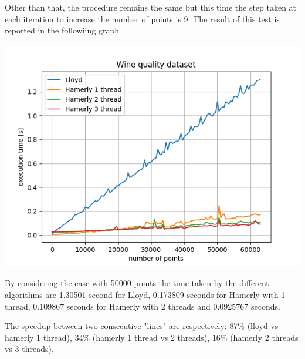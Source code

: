 \documentclass{report}
\begin{document}
\begin{minipage}[b]{0.48\textwidth}
  Other than that, the procedure remains the same but this time the step taken at each iteration to increase the number of points is 9. The result of this test is reported in the followiing graph

  \begin{center} 
    \includegraphics[width = 1\textwidth]{imgs/lh123_wine.png}
    \label{fig:lh123_wine}
  \end{center}

  By considering the case with 50000 points the time taken by the different algorithms are 1.30501 second for Lloyd, 0.173809 seconds for Hamerly with 1 thread, 0.109867 seconds for Hamerly with 2 threads and 0.0925767 seconds.

  The speedup between two consecutive "lines" are respectively: 87\% (lloyd vs hamerly 1 thread), 34\% (hamerly 1 thread vs 2 threads), 16\% (hamerly 2 threads vs 3 threads).
\end{minipage}
\hspace{0.1in}
\begin{minipage}[b]{0.48\textwidth}
  
\end{minipage}
\end{document}
